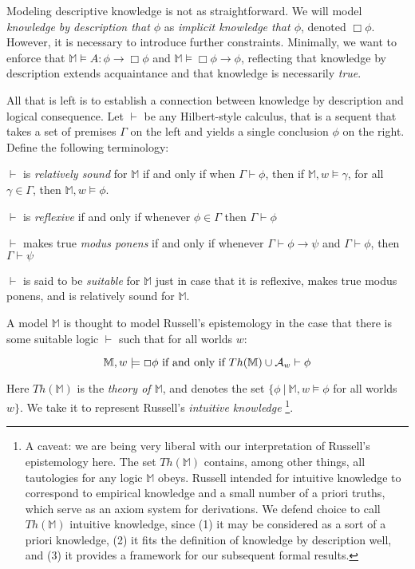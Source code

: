 Modeling descriptive knowledge is not as straightforward.  We will model
\emph{knowledge by description that $\phi$} as \emph{implicit knowledge
  that $\phi$}, denoted $\Box\phi$.  However, it is necessary to introduce
further constraints.
Minimally, we want to enforce that $\mathbb{M} \models A : \phi \to \Box \phi$ and
$\mathbb{M} \models \Box \phi \to \phi$, reflecting that knowledge by
description extends acquaintance and that knowledge is necessarily
\emph{true}.

All that is left is to establish a connection between knowledge by
description and logical
consequence.  Let $\vdash$ be any Hilbert-style calculus,
that is a sequent that takes a set of premises $\Gamma$ on the left and yields a
single conclusion $\phi$ on the right. Define the following terminology:
\begin{itemizedot}
\item $\vdash$ is \emph{relatively sound} for $\mathbb{M}$ if and only if
  when $\Gamma \vdash \phi$, then if $\mathbb{M},w\models \gamma$, for
  all $\gamma \in \Gamma$, then
  $\mathbb{M},w \models \phi$.
\item $\vdash$ is \emph{reflexive} if and only if whenever $\phi \in
  \Gamma$ then $\Gamma \vdash \phi$
\item $\vdash$ makes true \emph{modus ponens} if and only if whenever
  $\Gamma \vdash \phi \to \psi$ and $\Gamma \vdash \phi$, then $\Gamma
  \vdash \psi$
\item $\vdash$ is said to be \emph{suitable} for $\mathbb{M}$ just in
  case that it is reflexive, makes true modus ponens, and is
  relatively sound for $\mathbb{M}$.
\end{itemizedot}

A model $\mathbb{M}$ is thought to model Russell's epistemology in the
case that there is some suitable logic $\vdash$ such that for all
worlds $w$:

\[ \mathbb{M}, w \models \Box \phi \textup{ if and only if } Th(\mathbb{M}) \cup
\mathcal{A}_w \vdash \phi \]

Here $Th(\mathbb{M})$ is the \emph{theory of $\mathbb{M}$}, and
denotes the set $\{ \phi\ |\ \mathbb{M},w \models \phi$ for all worlds
$w \}$.  We take it to represent Russell's \emph{intuitive
  knowledge} \footnote{A caveat: we are being very liberal with our interpretation
  of Russell's
  epistemology here.  The set $Th(\mathbb{M})$ contains, among other
  things, all tautologies for any logic $\mathbb{M}$ obeys.  Russell
  intended for intuitive knowledge to correspond to empirical
  knowledge and a small number of a priori truths, which serve as
  an axiom system for derivations.  We defend choice to call $Th(\mathbb{M})$ intuitive
  knowledge, since (1) it may be considered as a sort of a priori knowledge, (2) it fits the definition of knowledge by description well,
  and (3) it provides a framework for our subsequent formal
  results.}. 
  
